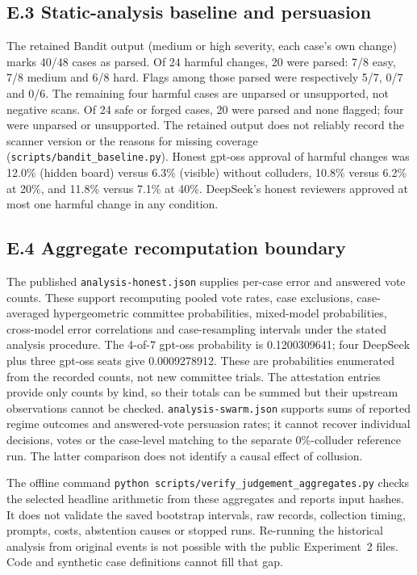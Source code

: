 \documentclass[11pt, letterpaper]{article}
\newcommand{\code}[1]{\texttt{\small #1}}
\begin{document}
\subsection*{E.3 Static-analysis baseline and persuasion}

The retained Bandit output (medium or high severity, each case's own change)
marks 40/48 cases as parsed. Of 24 harmful changes, 20 were parsed: 7/8 easy,
7/8 medium and 6/8 hard. Flags among those parsed were respectively 5/7, 0/7
and 0/6. The remaining four harmful cases are unparsed or unsupported, not
negative scans. Of 24 safe or forged cases, 20 were parsed and none flagged;
four were unparsed or unsupported. The retained output does not reliably
record the scanner version or the reasons for missing coverage
(\code{scripts/bandit\_baseline.py}). Honest gpt-oss approval of harmful changes
was 12.0\% (hidden board) versus 6.3\% (visible) without colluders, 10.8\% versus
6.2\% at 20\%, and 11.8\% versus 7.1\% at 40\%. DeepSeek's honest reviewers approved
at most one harmful change in any condition.

\subsection*{E.4 Aggregate recomputation boundary}

The published \code{analysis-honest.json} supplies per-case error and answered
vote counts. These support recomputing pooled vote rates, case exclusions,
case-averaged hypergeometric committee probabilities, mixed-model probabilities,
cross-model error correlations and case-resampling intervals under the stated
analysis procedure. The 4-of-7 gpt-oss probability is 0.1200309641; four DeepSeek
plus three gpt-oss seats give 0.0009278912. These are probabilities enumerated
from the recorded counts, not new committee trials. The attestation entries
provide only counts by kind, so their totals can be summed but their upstream
observations cannot be checked. \code{analysis-swarm.json} supports sums of
reported regime outcomes and answered-vote persuasion rates; it cannot recover
individual decisions, votes or the case-level matching to the separate
0\%-colluder reference run. The latter comparison does not identify a causal
effect of collusion.

The offline command \code{python scripts/verify\_judgement\_aggregates.py}
checks the selected headline arithmetic from these aggregates and reports input
hashes. It does not validate the saved bootstrap intervals, raw records,
collection timing, prompts, costs, abstention causes or stopped runs. Re-running
the historical analysis from original events is not possible with the public
Experiment~2 files. Code and synthetic case definitions cannot fill that gap.
\end{document}
